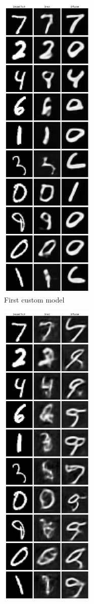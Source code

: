 \documentclass[12pt]{article}
\begin{document}
\begin{figure}[hp]
    \begin{subfigure}{0.49\textwidth}
    \includegraphics[width=0.9\linewidth, height=15cm, center]{figures/gt_direct_diffusion_9.png}
    \caption{First custom model}
    \label{fig:gt_direct_9}
    \end{subfigure}
    \begin{subfigure}{0.49\textwidth}
    \includegraphics[width=0.9\linewidth, height=15cm, center]{figures/gt_direct_diffusion_10.png}

\end{subfigure}
\end{figure}
\end{document}
